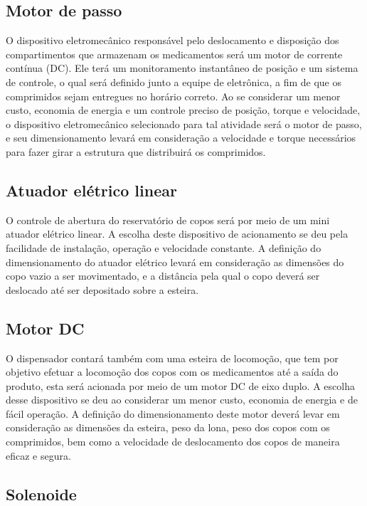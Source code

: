 

\subsection{Motor de passo}

 O dispositivo eletromecânico responsável pelo deslocamento e disposição dos compartimentos que armazenam os medicamentos será um motor de corrente contínua (DC). Ele terá um monitoramento instantâneo de posição e um sistema de controle, o qual será definido junto a equipe de eletrônica, a fim de que os comprimidos sejam entregues no horário correto. Ao se considerar um menor custo, economia de energia e um controle preciso de posição, torque e velocidade, o dispositivo eletromecânico selecionado para tal atividade será o motor de passo, e seu dimensionamento levará em consideração a velocidade e torque necessários para fazer girar a estrutura que distribuirá os comprimidos.
    
\subsection{Atuador elétrico linear}

O controle de abertura do reservatório de copos será por meio de um mini atuador elétrico linear. A escolha deste dispositivo de acionamento se deu pela facilidade de instalação, operação e velocidade constante. A definição do dimensionamento do atuador elétrico levará em consideração as dimensões do copo vazio a ser movimentado, e a distância pela qual o copo deverá ser deslocado até ser depositado sobre a esteira.

\subsection{Motor DC}

O dispensador contará também com uma esteira de locomoção, que tem por objetivo efetuar a locomoção dos copos com os medicamentos até a saída do produto, esta será acionada por meio de um motor DC de eixo duplo. A escolha desse dispositivo se deu ao considerar um menor custo, economia de energia e de fácil operação. A definição do dimensionamento deste motor deverá levar em consideração as dimensões da esteira, peso da lona, peso dos copos com os comprimidos, bem como a velocidade de deslocamento dos copos de maneira eficaz e segura.

\subsection{Solenoide}

